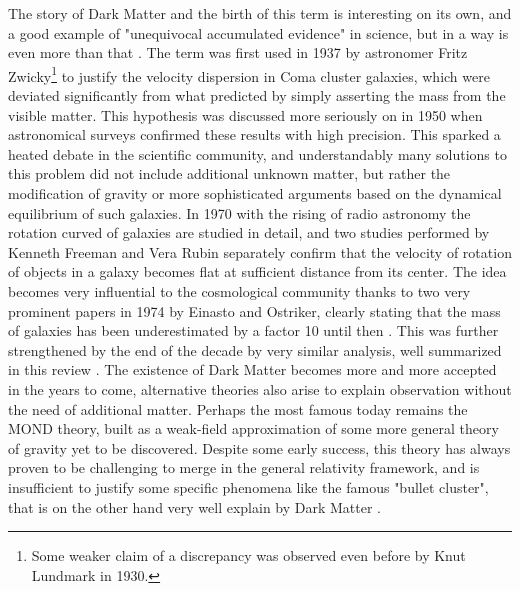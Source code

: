 The story of Dark Matter and the birth of this term is interesting on its own, and a good example of "unequivocal accumulated evidence" in science, but in a way is even more than that \cite{hooper, deSwart:2017heh}. The term was first used in 1937 by astronomer Fritz Zwicky\footnote{Some weaker claim of a discrepancy was observed even before by Knut Lundmark in 1930.} to justify the velocity dispersion in Coma cluster galaxies, which were deviated significantly from what predicted by simply asserting the mass from the visible matter. This hypothesis was discussed more seriously on in 1950 when astronomical surveys confirmed these results with high precision. This sparked a heated debate in the scientific community, and understandably many solutions to this problem did not include additional unknown matter, but rather the modification of gravity or more sophisticated arguments based on the dynamical equilibrium of such galaxies. In 1970 with the rising of radio astronomy the rotation curved of galaxies are studied in detail, and two studies performed by Kenneth Freeman and Vera Rubin separately confirm that the velocity of rotation of objects in a galaxy becomes flat at sufficient distance from its center. The idea becomes very influential to the cosmological community thanks to two very prominent papers in 1974 by Einasto and Ostriker, clearly stating that the mass of galaxies has been underestimated by a factor 10 until then \cite{EINASTO1974,1974ApJ...193L...1O}. This was further strengthened by the end of the decade by very similar analysis, well summarized in this review \cite{annurev.aa.17.090179.001031}. The existence of Dark Matter becomes more and more accepted in the years to come, alternative theories also arise to explain observation without the need of additional matter. Perhaps the most famous today remains the MOND theory, built as a weak-field approximation of some more general theory of gravity yet to be discovered. Despite some early success, this theory has always proven to be challenging to merge in the general relativity framework, and is insufficient to justify some specific phenomena like the famous "bullet cluster", that is on the other hand very well explain by Dark Matter \cite{Clowe_2006}.

